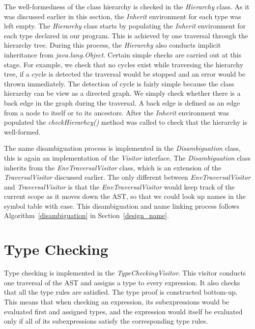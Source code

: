 \documentclass[a4paper, notitlepage]{report}
\begin{document}
The well-formedness of the class hierarchy is checked in the \emph{Hierarchy} class. As it was discussed earlier in this section, the \emph{Inherit} environment for each type was left empty. The \emph{Hierarchy} class starts by populating the \emph{Inherit} environment for each type declared in our program. This is achieved by one traversal through the hierarchy tree. During this process, the \emph{Hierarchy} also conducts implicit inheritance from \emph{java.lang.Object}. Certain simple checks are carried out at this stage. For example, we check that no cycles exist while traversing the hierarchy tree, if a cycle is detected the traversal would be stopped and an error would be thrown immediately. The detection of cycle is fairly simple because the class hierarchy can be view as a directed graph. We simply check whether there is a back edge in the graph during the traversal. A back edge is defined as an edge from a node to itself or to its ancestors. After the \emph{Inherit} environment was populated the \emph{checkHierarhcy()} method was called to check that the hierarchy is well-formed.

The name disambiguation process is implemented in the \emph{Disambiguation} class, this is again an implementation of the \emph{Visitor} interface. The \emph{Disambiguation} class inherits from the \emph{EnvTraversalVisitor} class, which is an extension of the \emph{TraversalVisitor} discussed earlier. The only different between \emph{EnvTraversalVisitor} and \emph{TraversalVisitor} is that the \emph{EnvTraversalVisitor} would keep track of the current scope as it moves down the AST, so that we could look up names in the symbol table with ease. This disambiguation and name linking process follows Algorithm~\ref{disambiguation} in Section~\ref{design_name}.

\section{Type Checking}


Type checking is implemented in the \emph{TypeCheckingVisitor}. This visitor conducts one traversal of the AST and assigns a type to every expression. It also checks that all the type rules are satisfied. The type proof is constructed bottom-up. This means that when checking an expression, its subexpressions would be evaluated first and assigned types, and the expression would itself be evaluated only if all of its subexpressions satisfy the corresponding type rules.
\end{document}
